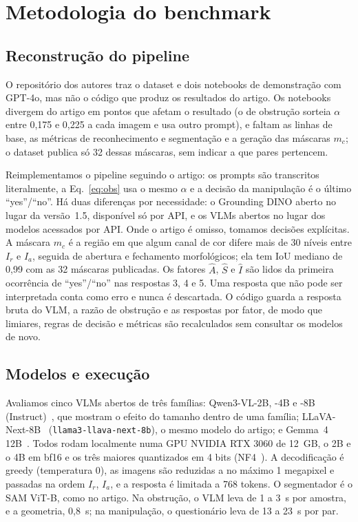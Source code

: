 \documentclass[conference]{IEEEtran}
\newcommand{\Ir}{I_r}
\newcommand{\Ia}{I_a}
\begin{document}
\section{Metodologia do benchmark}
\label{sec:metodo}

\subsection{Reconstrução do pipeline}
\label{sec:reconstrucao}
O repositório dos autores traz o dataset e dois notebooks de demonstração com GPT-4o, mas não o código
que produz os resultados do artigo. Os notebooks divergem do artigo em pontos que afetam o resultado (o
de obstrução sorteia $\alpha$ entre 0,175 e 0,225 a cada imagem e usa outro prompt), e faltam as linhas
de base, as métricas de reconhecimento e segmentação e a geração das máscaras $m_c$; o dataset publica só
32 dessas máscaras, sem indicar a que pares pertencem.

Reimplementamos o pipeline seguindo o artigo: os prompts são transcritos literalmente, a
Eq.~\eqref{eq:obs} usa o mesmo $\alpha$ e a decisão da manipulação é o último ``yes''/``no''. Há duas
diferenças por necessidade: o Grounding DINO aberto no lugar da versão~1.5, disponível só por API, e os
VLMs abertos no lugar dos modelos acessados por API. Onde o artigo é omisso, tomamos decisões explícitas.
A máscara $m_c$ é a região em que algum canal de cor difere mais de 30 níveis entre $\Ir$ e $\Ia$, seguida
de abertura e fechamento morfológicos; ela tem IoU mediano de 0,99 com as 32 máscaras publicadas. Os
fatores $\hat A$, $\hat S$ e $\hat I$ são lidos da primeira ocorrência de ``yes''/``no'' nas respostas 3,
4 e 5. Uma resposta que não pode ser interpretada conta como erro e nunca é descartada. O código guarda a
resposta bruta do VLM, a razão de obstrução e as respostas por fator, de modo que limiares, regras de
decisão e métricas são recalculados sem consultar os modelos de novo.

\subsection{Modelos e execução}
Avaliamos cinco VLMs abertos de três famílias: Qwen3-VL-2B, -4B e -8B (Instruct)~\cite{qwen3vl}, que
mostram o efeito do tamanho dentro de uma família; LLaVA-Next-8B~\cite{llava}
(\texttt{llama3-llava-next-8b}), o mesmo modelo do artigo; e Gemma~4 12B~\cite{gemma4}. Todos rodam
localmente numa GPU NVIDIA RTX 3060 de 12~GB, o 2B e o 4B em bf16 e os três maiores quantizados em 4 bits
(NF4~\cite{qlora}). A decodificação é greedy (temperatura 0), as imagens são reduzidas a no máximo 1
megapixel e passadas na ordem $\Ir$, $\Ia$, e a resposta é limitada a 768 tokens. O segmentador é o SAM
ViT-B, como no artigo. Na obstrução, o VLM leva de 1 a 3~s por amostra, e a geometria, 0,8~s; na
manipulação, o questionário leva de 13 a 23~s por par.
\end{document}
